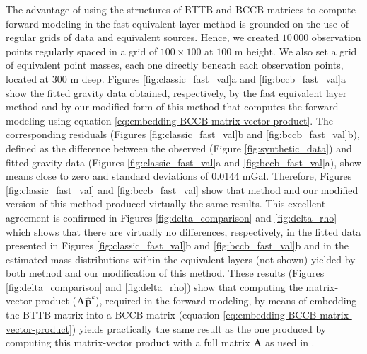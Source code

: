 \documentclass[manuscript,revised]{geophysics}
\begin{document}
The advantage of using the structures of BTTB and BCCB matrices to compute forward modeling in  the fast-equivalent layer method \cite[]{siqueira-etal2017} is grounded on the use of regular grids of data and equivalent sources. Hence, we created $10\,000$ observation points regularly spaced in a grid of $100 \times 100$ at $100$ m height. We also set a grid of equivalent point masses, each one directly beneath each observation points, located at $300$ m deep.  Figures \ref{fig:classic_fast_val}a and \ref{fig:bccb_fast_val}a  show the fitted gravity data obtained, respectively, by the fast equivalent layer method and by our modified form of this method that computes the forward modeling using equation \ref{eq:embedding-BCCB-matrix-vector-product}. The corresponding residuals (Figures \ref{fig:classic_fast_val}b and \ref{fig:bccb_fast_val}b), defined as the difference between the observed (Figure  \ref{fig:synthetic_data}) and fitted gravity data (Figures \ref{fig:classic_fast_val}a and \ref{fig:bccb_fast_val}a), show means close to zero  and standard deviations of 0.0144 mGal.  Therefore, Figures \ref{fig:classic_fast_val} and \ref{fig:bccb_fast_val} show that \citet{siqueira-etal2017} method and our modified version of this method produced virtually the same results. This excellent agreement is confirmed in Figures \ref{fig:delta_comparison} and \ref{fig:delta_rho} which shows that there are virtually no differences, respectively,  in the fitted data presented in Figures \ref{fig:classic_fast_val}b and \ref{fig:bccb_fast_val}b and in the estimated mass distributions within the equivalent layers (not shown) yielded by both \citet{siqueira-etal2017} method and our modification of this method.  These results (Figures \ref{fig:delta_comparison} and \ref{fig:delta_rho})  show that computing the matrix-vector product ($\mathbf{A} \hat{\mathbf{p}}^k$), required in the forward modeling, by means of embedding the BTTB matrix into a BCCB matrix (equation \ref{eq:embedding-BCCB-matrix-vector-product}) yields practically the same result as the one produced by computing this matrix-vector product  with a full matrix $\mathbf{A}$ as used in \citet{siqueira-etal2017}.
\end{document}
